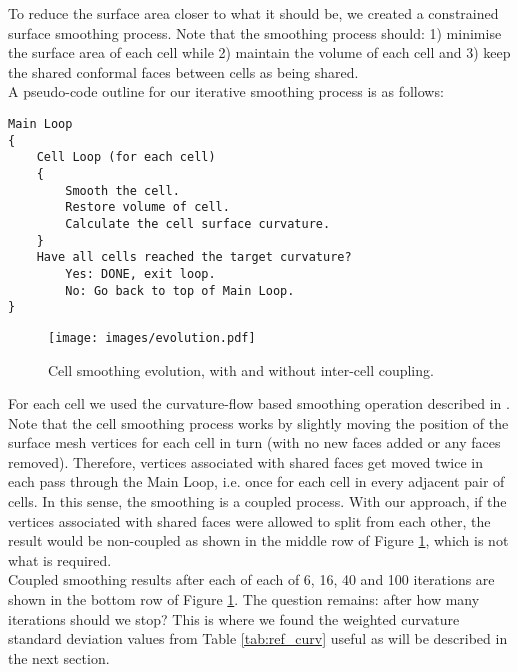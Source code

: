 \documentclass[a4paper,10pt]{article}
\begin{document}
To reduce the surface area closer to what it should be, we created a constrained surface smoothing process. Note that the smoothing process should: 1) minimise the surface area of each cell while 2) maintain the volume of each cell and 3) keep the shared conformal faces between cells as being shared.\\

A pseudo-code outline for our iterative smoothing process is as follows:
\begin{verbatim}
Main Loop
{
    Cell Loop (for each cell)
    {
        Smooth the cell.
        Restore volume of cell.
        Calculate the cell surface curvature.
    }
    Have all cells reached the target curvature?
        Yes: DONE, exit loop.
        No: Go back to top of Main Loop.  
}
\end{verbatim}

\begin{figure}[H]
\begin{center}
\texttt{[image: images/evolution.pdf]}
\end{center}
\caption{Cell smoothing evolution, with and without inter-cell coupling.}
\label{fig:cell_morph}
\end{figure}

For each cell we used the curvature-flow based smoothing operation described in \cite{Desbrun:1999:IFI:311535.311576}. Note that the cell smoothing process works by slightly moving the position of the surface mesh vertices for each cell in turn (with no new faces added or any faces removed). Therefore, vertices associated with shared faces get moved twice in each pass through the Main Loop, i.e. once for each cell in every adjacent pair of cells. In this sense, the smoothing is a coupled process. With our approach, if the vertices associated with shared faces were allowed to split from each other, the result would be non-coupled as shown in the middle row of Figure \ref{fig:cell_morph}, which is not what is required.\\

Coupled smoothing results after each of each of 6, 16, 40 and 100 iterations are shown in the bottom row of Figure \ref{fig:cell_morph}.
The question remains: after how many iterations should we stop? This is where we found the weighted curvature standard deviation values from Table \ref{tab:ref_curv} useful as will be described in the next section.\\
\end{document}
